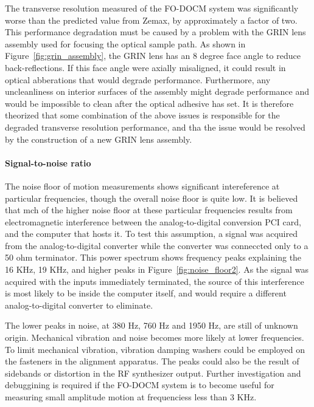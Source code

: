 The transverse resolution measured of the FO-DOCM system was significantly worse than the predicted value from Zemax, by approximately a factor of two. This performance degradation must be caused by a problem with the GRIN lens assembly used for focusing the optical sample path. As shown in Figure~\ref{fig:grin_assembly}, the GRIN lens has an 8 degree face angle to reduce back-reflections. If this face angle were axially misaligned, it could result in optical abberations that would degrade performance. Furthermore, any uncleanliness on interior surfaces of the assembly might degrade performance and would be impossible to clean after the optical adhesive has set. It is therefore theorized that some combination of the above issues is responsible for the degraded transverse resolution performance, and tha the issue would be resolved by the construction of a new GRIN lens assembly.

\paragraph{Signal-to-noise ratio}

The noise floor of motion measurements shows significant intereference at particular frequencies, though the overall noise floor is quite low. It is believed that mch of the higher noise floor at these particular frequencies results from electromagnetic interference between the analog-to-digital conversion PCI card, and the computer that hosts it. To test this assumption, a signal was acquired from the analog-to-digital converter while the converter was conneccted only to a 50 ohm terminator. This power spectrum shows frequency peaks explaining the 16 KHz, 19 KHz, and higher peaks in Figure~\ref{fig:noise_floor2}. As the signal was acquired with the inputs immediately terminated, the source of this interference is most likely to be inside the computer itself, and would require a different analog-to-digital converter to eliminate. %

The lower peaks in noise, at 380 Hz, 760 Hz and 1950 Hz, are still of unknown origin. Mechanical vibration and noise becomes more likely at lower frequencies. To limit mechanical vibration, vibration damping washers could be employed on the fasteners in the alignment apparatus. The peaks could also be the result of sidebands or distortion in the RF synthesizer output. Further investigation and debuggining is required if the FO-DOCM system is to become useful for measuring small amplitude motion at frequenciess less than 3 KHz.

